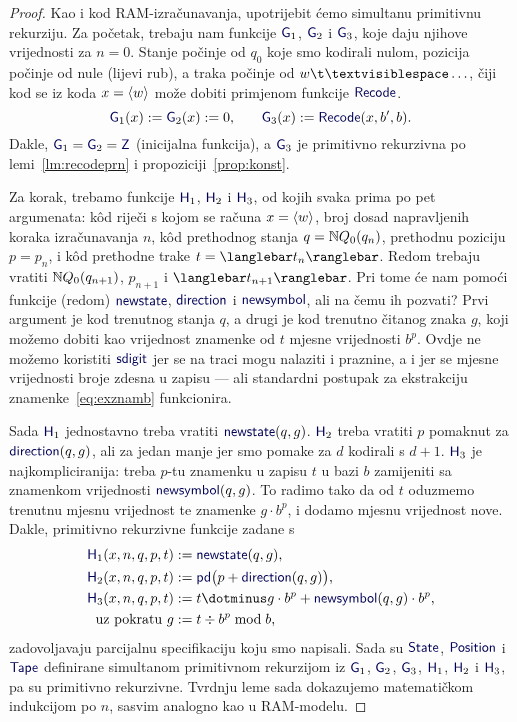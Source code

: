 \begin{proof}
Kao i kod RAM-izračunavanja, upotrijebit ćemo simultanu primitivnu rekurziju. Za početak, trebaju nam funkcije $\f G_1$, $\f G_2$ i $\f G_3$, koje daju njihove vrijednosti za $n=0$. Stanje počinje od $q_0$ koje smo kodirali nulom, pozicija počinje od nule (lijevi rub), a traka počinje od $w\bl\ldots$, čiji kod se iz koda $x=\langle w\rangle$ može dobiti primjenom funkcije $\f{Recode}$.
\begin{equation}
    \f G_1(x):=\f G_2(x):=0\text,\qquad
    \f G_3(x):=\f{Recode}(x,b',b)\text.
\end{equation}
Dakle, $\f G_1=\f G_2=\f Z$ (inicijalna funkcija), a $\f G_3$ je primitivno rekurzivna po lemi~\ref{lm:recodeprn} i propoziciji~\ref{prop:konst}.

    Za korak, trebamo funkcije $\f H_1$, $\f H_2$ i $\f H_3$, od kojih svaka prima po pet argumenata: k\^od riječi s kojom se računa $x=\langle w\rangle$, broj dosad napravljenih koraka izračunavanja $n$, k\^od prethodnog stanja $q={\mathbb N} Q_0(q_n)$, prethodnu poziciju $p=p_n$, i k\^od prethodne trake $t=\knk{t_n}$. Redom trebaju vratiti ${\mathbb N} Q_0(q_{n+1})$, $p_{n+1}$ i $\knk{t_{n+1}}$. Pri tome će nam pomoći funkcije (redom) $\f{newstate}$, $\f{direction}$ i $\f{newsymbol}$, ali na čemu ih pozvati? Prvi argument je kod trenutnog stanja $q$, a drugi je kod trenutno čitanog znaka $g$, koji možemo dobiti kao vrijednost znamenke od $t$ mjesne vrijednosti $b^p$. Ovdje ne možemo koristiti $\f{sdigit}$ jer se na traci mogu nalaziti i praznine, a i jer se mjesne vrijednosti broje zdesna u zapisu --- ali standardni postupak za ekstrakciju znamenke~\eqref{eq:exznamb} funkcionira.

Sada $\f H_1$ jednostavno treba vratiti $\f{newstate}(q,g)$. $\f H_2$ treba vratiti $p$ pomaknut za $\f{direction}(q,g)$, ali za jedan manje jer smo pomake za $d$ kodirali s $d+1$. $\f H_3$ je najkompliciranija: treba $p$-tu znamenku u zapisu $t$ u bazi $b$ zamijeniti sa znamenkom vrijednosti $\f{newsymbol}(q,g)$. To radimo tako da od $t$ oduzmemo trenutnu mjesnu vrijednost te znamenke $g\cdot b^p$, i dodamo mjesnu vrijednost nove. Dakle, primitivno rekurzivne funkcije zadane s
\begin{align}
    \f H_1(x,n,q,p,t)&:=\f{newstate}(q,g)\text,\\
    \f H_2(x,n,q,p,t)&:=\f{pd}\bigl(p+\f{direction}(q,g)\bigr)\text,\\
    \f H_3(x,n,q,p,t)&:=t\dotminus g\cdot b^p+\f{newsymbol}(q,g)\cdot b^p\text,\\
    \label{eq:exznamb}\text{uz pokratu }g&:=t\div b^p\bmod b\text,
\end{align}
zadovoljavaju parcijalnu specifikaciju koju smo napisali. Sada su $\f{State}$, $\f{Position}$ i $\f{Tape}$ definirane simultanom primitivnom rekurzijom iz $\f G_1$, $\f G_2$, $\f G_3$, $\f H_1$, $\f H_2$ i $\f H_3$, pa su primitivno rekurzivne. Tvrdnju leme sada dokazujemo matematičkom indukcijom po $n$, sasvim analogno kao u RAM-modelu.


\end{proof}
